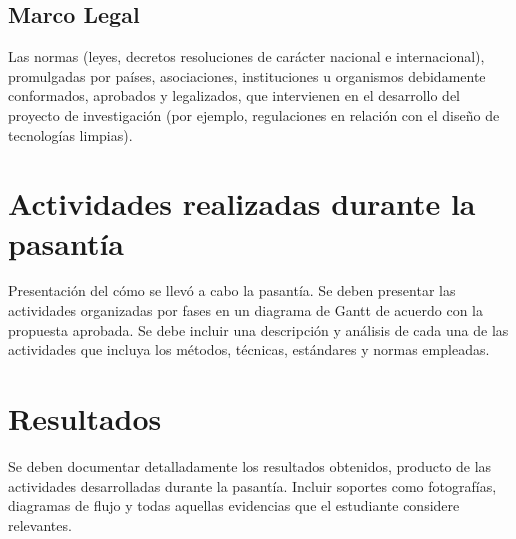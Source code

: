 \documentclass[12pt,letterpaper]{report}
\begin{document}
\section{Marco Legal}

Las normas (leyes, decretos resoluciones de carácter nacional e internacional), promulgadas por países, asociaciones, instituciones u organismos debidamente conformados, aprobados y legalizados, que intervienen en el desarrollo del proyecto de investigación (por ejemplo, regulaciones en relación con el diseño de tecnologías limpias).

\chapter{Actividades realizadas durante la pasantía}

Presentación del cómo se llevó a cabo la pasantía. Se deben presentar las actividades organizadas por fases en un diagrama de Gantt de acuerdo con la propuesta aprobada. Se debe incluir una descripción y análisis de cada una de las actividades que incluya los métodos, técnicas, estándares y normas empleadas.

\chapter{Resultados}

Se deben documentar detalladamente los resultados obtenidos, producto de las actividades desarrolladas durante la pasantía. Incluir soportes como fotografías, diagramas de flujo y todas aquellas evidencias que el estudiante considere relevantes.


\end{document}
